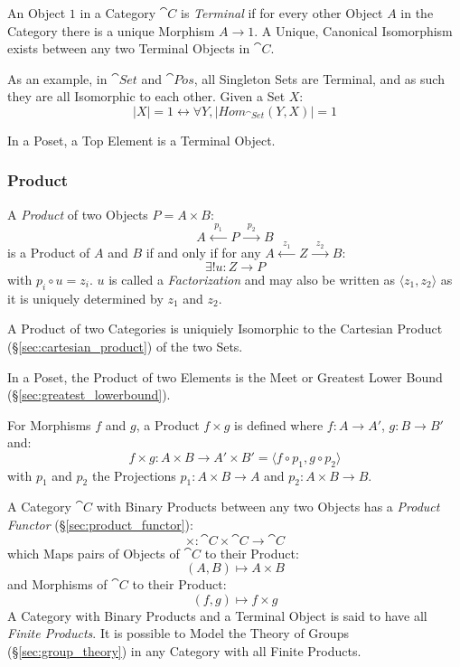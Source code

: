 An Object $1$ in a Category $\cat{C}$ is \emph{Terminal} if for
every other Object $A$ in the Category there is a unique Morphism $A
\rightarrow 1$. A Unique, Canonical Isomorphism exists between any two
Terminal Objects in $\cat{C}$.

As an example, in $\cat{Set}$ and $\cat{Pos}$, all Singleton
Sets are Terminal, and as such they are all Isomorphic to each other.
Given a Set $X$:
\[
  |X| = 1 \leftrightarrow \forall Y, |Hom_{\cat{Set}}(Y,X)| = 1
\]

In a Poset, a Top Element is a Terminal Object.



\subsubsection{Product}\label{sec:product}

A \emph{Product} of two Objects $P = A \times B$:
\[
  A \xleftarrow{\;\;p_1\;\;} P \xrightarrow{\;\;p_2\;\;} B
\]
is a Product of $A$ and $B$ if and only if for any $A
\xleftarrow{\;\;z_1\;\;} Z \xrightarrow{\;\;z_2\;\;} B$:
\[
  \exists!u : Z \rightarrow P
\]
with $p_i \circ u = z_i$. $u$ is called a \emph{Factorization} and may
also be written as $\langle z_1, z_2 \rangle$ as it is uniquely
determined by $z_1$ and $z_2$.

A Product of two Categories is uniquiely Isomorphic to the Cartesian
Product (\S\ref{sec:cartesian_product}) of the two Sets.

In a Poset, the Product of two Elements is the Meet or Greatest Lower
Bound (\S\ref{sec:greatest_lowerbound}).

For Morphisms $f$ and $g$, a Product $f \times g$ is defined where $f
: A \rightarrow A'$, $g : B \rightarrow B'$ and:
\[
  f \times g : A \times B \rightarrow A' \times B' =
  \langle f \circ p_1, g \circ p_2 \rangle
\]
with $p_1$ and $p_2$ the Projections $p_1 : A \times B \rightarrow A$
and $p_2 : A \times B \rightarrow B$.

A Category $\cat{C}$ with Binary Products between any two Objects
has a \emph{Product Functor} (\S\ref{sec:product_functor}):
\[
  \times : \cat{C} \times \cat{C} \rightarrow \cat{C}
\]
which Maps pairs of Objects of $\cat{C}$ to their Product:
\[
  (A,B) \mapsto A \times B
\]
and Morphisms of $\cat{C}$ to their Product:
\[
  (f,g) \mapsto f \times g
\]
A Category with Binary Products and a Terminal Object is said to have
all \emph{Finite Products}. It is possible to Model the Theory of
Groups (\S\ref{sec:group_theory}) in any Category with all Finite
Products.

